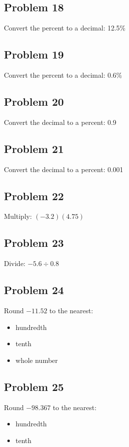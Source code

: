\documentclass[12pt]{article}
\begin{document}
\subsection*{Problem 18}
Convert the percent to a decimal: 12.5\%

\subsection*{Problem 19}
Convert the percent to a decimal: 0.6\%

\subsection*{Problem 20}
Convert the decimal to a percent: 0.9

\subsection*{Problem 21}
Convert the decimal to a percent: 0.001

\subsection*{Problem 22}
Multiply: \((-3.2)(4.75)\)

\subsection*{Problem 23}
Divide: \(-5.6 \div 0.8\)

\subsection*{Problem 24}
Round \(-11.52\) to the nearest:
\begin{itemize}
    \item hundredth
    \item tenth
    \item whole number
\end{itemize}

\subsection*{Problem 25}
Round \(-98.367\) to the nearest:
\begin{itemize}
    \item hundredth
    \item tenth
\end{itemize}
\end{document}
